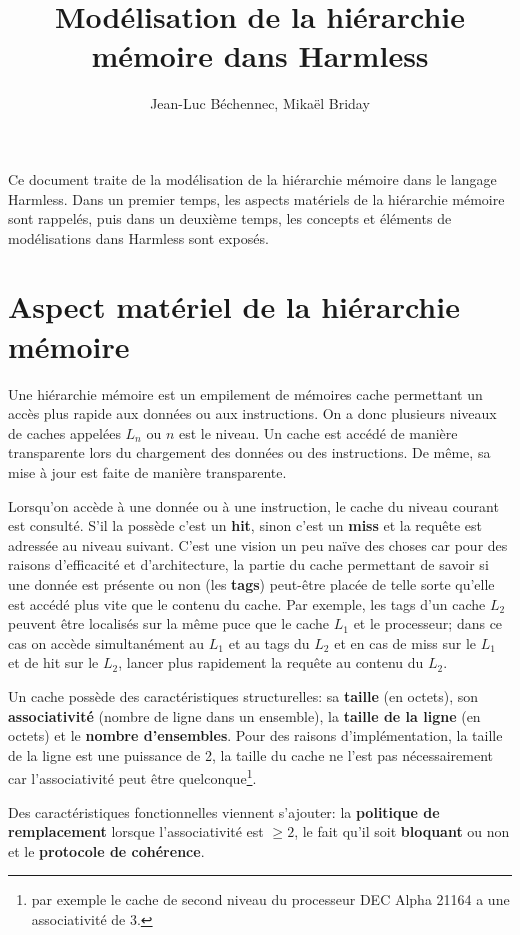 \documentclass[11pt,a4paper]{article}
\title{Modélisation de la hiérarchie mémoire dans Harmless}
\author{Jean-Luc Béchennec, Mikaël Briday}
\begin{document}
\maketitle
\tableofcontents
Ce document traite de la modélisation de la hiérarchie mémoire dans le langage Harmless. Dans un premier temps, les aspects matériels de la hiérarchie mémoire sont rappelés, puis dans un deuxième temps, les concepts et éléments de modélisations dans Harmless sont exposés.

\section{Aspect matériel de la hiérarchie mémoire}

Une hiérarchie mémoire est un empilement de mémoires cache permettant un accès plus rapide aux données ou aux instructions. On a donc plusieurs niveaux de caches appelées $L_n$ ou $n$ est le niveau. Un cache est accédé de manière transparente lors du chargement des données ou des instructions. De même, sa mise à jour est faite de manière transparente.

Lorsqu'on accède à une donnée ou à une instruction, le cache du niveau courant est consulté. S'il la possède c'est un {\bf hit}, sinon c'est un {\bf miss} et la requête est adressée au niveau suivant. C'est une vision un peu naïve des choses car pour des raisons d'efficacité et d'architecture, la partie du cache permettant de savoir si une donnée est présente ou non (les {\bf tags}) peut-être placée de telle sorte qu'elle est accédé plus vite que le contenu du cache. Par exemple, les tags d'un cache $L_2$ peuvent être localisés sur la même puce que le cache $L_1$ et le processeur; dans ce cas on accède simultanément au $L_1$ et au tags du $L_2$ et en cas de miss sur le $L_1$ et de hit sur le $L_2$, lancer plus rapidement la requête au contenu du $L_2$.

Un cache possède des caractéristiques structurelles: sa {\bf taille} (en octets), son {\bf associativité} (nombre de ligne dans un ensemble), la {\bf taille de la ligne} (en octets) et le {\bf nombre d'ensembles}. Pour des raisons d'implémentation, la taille de la ligne est une puissance de 2, la taille du cache ne l'est pas nécessairement car l'associativité peut être quelconque\footnote{par exemple le cache de second niveau du processeur DEC Alpha 21164 a une associativité de 3.}.

Des caractéristiques fonctionnelles viennent s'ajouter: la {\bf politique de remplacement} lorsque l'associativité est $\geq 2$, le fait qu'il soit {\bf bloquant} ou non et le {\bf protocole de cohérence}.
\end{document}
